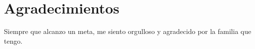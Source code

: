 \chapter{Agradecimientos}
Siempre que alcanzo un meta, me siento orgulloso y agradecido por la familia que tengo.

\newpage
\thispagestyle{empty}
\hspace*{0.5cm}
\newpage